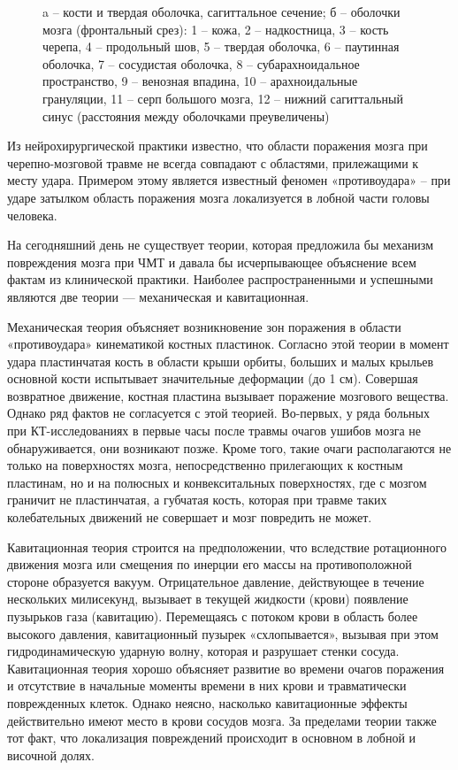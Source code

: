 \begin{figure}[htp]
\begin{subfigure}[b]{0.6\textwidth}
\end{subfigure}
\caption{a – кости и твердая оболочка, сагиттальное сечение; б – оболочки мозга (фронтальный срез): 1 – кожа, 2 – надкостница, 3 – кость черепа, 4 – продольный шов, 5 – твердая оболочка, 6 – паутинная оболочка, 7 – сосудистая оболочка, 8 – субарахноидальное пространство, 9 – венозная впадина, 10 – арахноидальные грануляции, 11 – серп большого мозга, 12 – нижний сагиттальный синус (расстояния между оболочками преувеличены)}
\label{pic:cranium_scheme}
\end{figure}

Из нейрохирургической практики известно, что области поражения мозга при черепно-мозговой травме не всегда совпадают с областями, прилежащими к месту удара. Примером этому является известный феномен «противоудара» – при ударе затылком область поражения мозга локализуется в лобной части головы человека.

На сегодняшний день не существует теории, которая предложила бы механизм повреждения мозга при ЧМТ и давала бы исчерпывающее объяснение всем фактам из клинической практики. Наиболее распространенными и успешными являются две теории — механическая и кавитационная.

Механическая теория объясняет возникновение зон поражения в области «противоудара» кинематикой костных пластинок. Согласно этой теории в момент удара пластинчатая кость в области крыши орбиты, больших и малых крыльев основной кости испытывает значительные деформации (до 1 см). Совершая возвратное движение, костная пластина вызывает поражение мозгового вещества. Однако ряд фактов не согласуется с этой теорией. Во-первых, у ряда больных при КТ-исследованиях в первые часы после травмы очагов ушибов мозга не обнаруживается, они возникают позже. Кроме того, такие очаги располагаются не только на поверхностях мозга, непосредственно прилегающих к костным пластинам, но и на полюсных и конвекситальных поверхностях, где с мозгом граничит не пластинчатая, а губчатая кость, которая при травме таких колебательных движений не совершает и мозг повредить не может.

Кавитационная теория строится на предположении, что вследствие ротационного движения мозга или смещения по инерции его массы на противоположной стороне образуется вакуум. Отрицательное давление, действующее в течение нескольких милисекунд, вызывает в текущей жидкости (крови) появление пузырьков газа (кавитацию). Перемещаясь с потоком крови в область более высокого давления, кавитационный пузырек «схлопывается», вызывая при этом гидродинамическую ударную волну, которая и разрушает стенки сосуда. Кавитационная теория хорошо объясняет развитие во времени очагов поражения и отсутствие в начальные моменты времени в них крови и травматически поврежденных клеток. Однако неясно, насколько кавитационные эффекты действительно имеют место в крови сосудов мозга. За пределами теории также тот факт, что локализация повреждений происходит в основном в лобной и височной долях.

